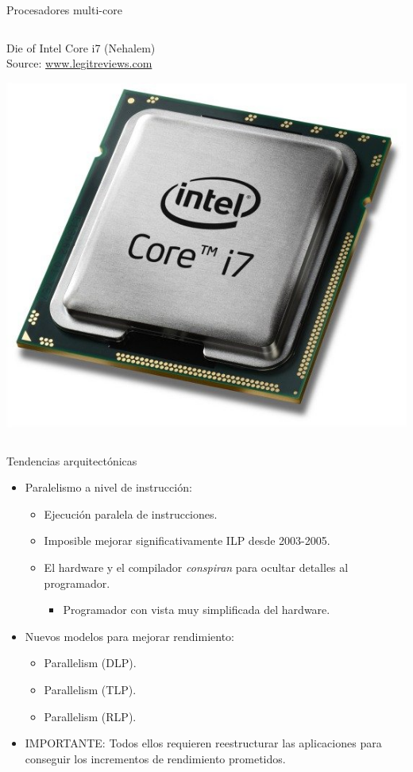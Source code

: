\begin{frame}[t,shrink=20]{Procesadores multi-core}
\begin{columns}[T]
\begin{column}{.35\textwidth}
    \begin{tiny}
      Die of Intel Core i7 (Nehalem)\\
      Source: \url{www.legitreviews.com}\\
    \end{tiny}
    \vfill
    \begin{center}
    \includegraphics[width=.45\textwidth]{images/intel-core-i7.jpg}\\
    \end{center}
  \end{column}
\end{columns}
\end{frame}

\begin{frame}[t]{Tendencias arquitectónicas}
\begin{itemize}
  \item Paralelismo a nivel de instrucción:
    \begin{itemize}
      \item Ejecución paralela de instrucciones.
      \item Imposible mejorar significativamente ILP desde 2003-2005.
      \item El hardware y el compilador \emph{conspiran} para ocultar detalles al programador.
        \begin{itemize}
          \item Programador con vista \alert{muy simplificada} del hardware.
        \end{itemize}
    \end{itemize}
  \item Nuevos modelos para mejorar rendimiento:
    \begin{itemize}
       \item {} Parallelism (DLP).
       \item {} Parallelism (TLP).
       \item {} Parallelism (RLP).
    \end{itemize}
  \item \alert{IMPORTANTE}: Todos ellos requieren reestructurar las aplicaciones
        para conseguir los incrementos de rendimiento prometidos.
\end{itemize}
\end{frame}
